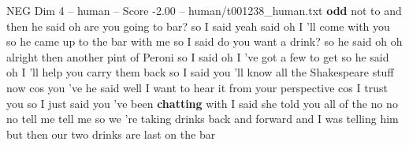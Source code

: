 \begin{textsample}{NEG Dim 4 – human – Score -2.00 – human/t001238\_human.txt}  \label{ex:f4_neg_035}
\textbf{odd} not to and then he said oh are you going to bar? so I said yeah said oh I 'll come with you so he came up to the bar with me so I said do you want a drink? so he said oh oh alright then another pint of Peroni so I said oh I 've got a few to get so he said oh I 'll help you carry them back so I said you 'll know all the Shakespeare stuff now cos you 've he said well I want to hear it from your perspective cos I trust you so I just said you 've been \textbf{chatting} with I said she told you all of the no no no tell me tell me so we 're taking drinks back and forward and I was telling him but then our two drinks are last on the bar

\end{textsample}
